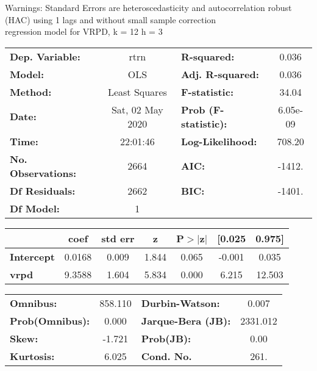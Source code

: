 Warnings: \newline
 [1] Standard Errors are heteroscedasticity and autocorrelation robust (HAC) using 1 lags and without small sample correction\\ 

regression model for VRPD, k = 12 h = 3\begin{center}
\begin{tabular}{lclc}
\toprule
\textbf{Dep. Variable:}    &       rtrn       & \textbf{  R-squared:         } &     0.036   \\
\textbf{Model:}            &       OLS        & \textbf{  Adj. R-squared:    } &     0.036   \\
\textbf{Method:}           &  Least Squares   & \textbf{  F-statistic:       } &     34.04   \\
\textbf{Date:}             & Sat, 02 May 2020 & \textbf{  Prob (F-statistic):} &  6.05e-09   \\
\textbf{Time:}             &     22:01:46     & \textbf{  Log-Likelihood:    } &    708.20   \\
\textbf{No. Observations:} &        2664      & \textbf{  AIC:               } &    -1412.   \\
\textbf{Df Residuals:}     &        2662      & \textbf{  BIC:               } &    -1401.   \\
\textbf{Df Model:}         &           1      & \textbf{                     } &             \\
\bottomrule
\end{tabular}
\begin{tabular}{lcccccc}
                   & \textbf{coef} & \textbf{std err} & \textbf{z} & \textbf{P$> |$z$|$} & \textbf{[0.025} & \textbf{0.975]}  \\
\midrule
\textbf{Intercept} &       0.0168  &        0.009     &     1.844  &         0.065        &       -0.001    &        0.035     \\
\textbf{vrpd}      &       9.3588  &        1.604     &     5.834  &         0.000        &        6.215    &       12.503     \\
\bottomrule
\end{tabular}
\begin{tabular}{lclc}
\textbf{Omnibus:}       & 858.110 & \textbf{  Durbin-Watson:     } &    0.007  \\
\textbf{Prob(Omnibus):} &   0.000 & \textbf{  Jarque-Bera (JB):  } & 2331.012  \\
\textbf{Skew:}          &  -1.721 & \textbf{  Prob(JB):          } &     0.00  \\
\textbf{Kurtosis:}      &   6.025 & \textbf{  Cond. No.          } &     261.  \\
\bottomrule
\end{tabular}
\end{center}

